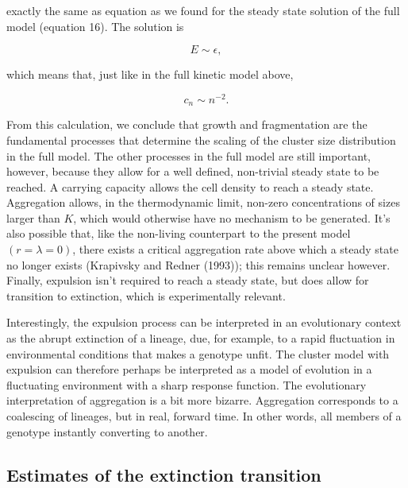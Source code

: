 \documentclass[12pt]{article}
\def\be{\begin{equation}}
\def\ee{\end{equation}}
\begin{document}
\noindent exactly the same as equation as we found for the steady state solution of the full model (equation 16). The solution is

\be
E \sim \epsilon,
\ee

\noindent which means that, just like in the full kinetic model above,

\be
c_n \sim n^{-2}.
\ee

\noindent  From this calculation, we conclude that growth and fragmentation are the fundamental processes that determine the scaling of the cluster size distribution in the full model. The other processes in the full model are still important, however, because they allow for a well defined, non-trivial steady state to be reached. A carrying capacity allows the cell density to reach a steady state. Aggregation allows, in the thermodynamic limit, non-zero concentrations of sizes larger than $K$, which would otherwise have no mechanism to be generated. It's also possible that, like the non-living counterpart to the present model $(r=\lambda=0)$, there exists a critical aggregation rate above which a steady state no longer exists (Krapivsky and Redner (1993)); this remains unclear however. Finally, expulsion isn't required to reach a steady state, but does allow for transition to extinction, which is experimentally relevant.

Interestingly, the expulsion process can be interpreted in an evolutionary context as the abrupt extinction of a lineage, due, for example, to a rapid fluctuation in environmental conditions that makes a genotype unfit. The cluster model with expulsion can therefore perhaps be interpreted as a model of evolution in a fluctuating environment with a sharp response function. The evolutionary interpretation of aggregation is a bit more bizarre. Aggregation corresponds to a coalescing of lineages, but in real, forward time. In other words, all members of a genotype instantly converting to another. 

\subsection*{Estimates of the extinction transition}

\end{document}
